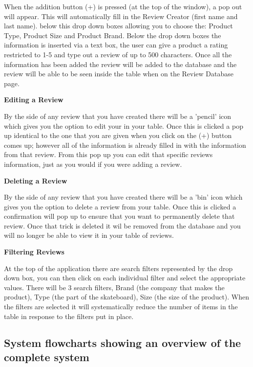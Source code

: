 When the addition button (+) is pressed (at the top of the window), a pop out will appear. This will automatically fill in the Review Creator (first name and last name). below this drop down boxes allowing you to choose the: Product Type, Product Size and Product Brand. Below the drop down boxes the information is inserted via a text box, the user can give a product a rating restricted to 1-5 and type out a review of up to 500 characters. Once all the information has been added the review will be added to the database and the review will be able to be seen inside the table when on the Review Database page. 


\textbf{Editing a Review}

By the side of any review that you have created there will be a 'pencil' icon which gives you the option to edit your in your table. Once this is clicked a pop up identical to the one that you are given when you click on the (+) button comes up; however all of the information is already filled in with the information from that review. From this pop up you can edit that specific reviews information, just as you would if you were adding a review.


\textbf{Deleting a Review}

By the side of any review that you have created there will be a 'bin' icon which gives you the option to delete a review from your table. Once this is clicked a confirmation will pop up to ensure that you want to permanently delete that review. Once that trick is deleted it wil be removed from the database and you will no longer be able to view it in your table of reviews.


\textbf{Filtering Reviews}

At the top of the application there are search filters represented by the drop down box, you can then click on each individual filter and select the appropriate values. There will be 3 search filters, Brand (the company that makes the product), Type (the part of the skateboard), Size (the size of the product). When the filters are selected it will systematically reduce the number of items in the table in response to the filters put in place. 


\subsection{System flowcharts showing an overview of the complete system}


